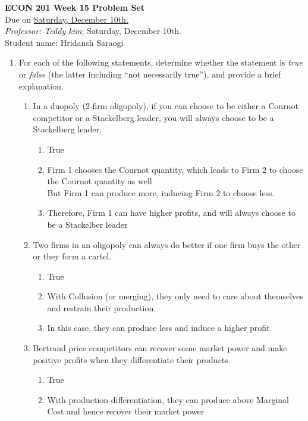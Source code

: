\documentclass[11pt]{article}
\begin{document}
\begin{center}
\textbf{ECON 201 Week 15 Problem Set}\\
Due on \underline{Saturday, December 10th.}
\\
\textit {Professor: Teddy kim};  
Saturday, December 10th.
\\Student name: Hridansh Saraogi

\end{center}

\begin{enumerate}
\item For each of the following statements, determine whether
the statement is \emph{true} or \emph{false} (the latter including ``not necessarily true''), and provide a brief explanation.
    \begin{enumerate}
    \item In a duopoly (2-firm oligopoly), if you can choose to be either a Cournot competitor or a Stackelberg leader, you will always choose to be a Stackelberg leader.
    \begin{enumerate}
        \item True
        \item Firm 1 chooses the Cournot quantity, which leads to Firm 2 to choose the Cournot quantity as well\\
        But Firm 1 can produce more, inducing Firm 2 to choose less. 
        \item Therefore, Firm 1 can have higher profits, and will always choose to be a Stackelber leader
    \end{enumerate}
	
	\item Two firms in an oligopoly can always do better if one firm buys the other or they form a cartel.
    \begin{enumerate}
        \item True
        \item With Collusion (or merging), they only need to care about themselves and restrain their production.
        \item In this case, they can produce less and induce a higher profit
    \end{enumerate}
	
	\item Bertrand price competitors can recover some market power and make positive profits when they differentiate their products.
	\begin{enumerate}
        \item True
        \item With production differentiation, they can produce above Marginal Cost and hence recover their market power
    \end{enumerate}
    

\end{enumerate}
\end{enumerate}
\end{document}
